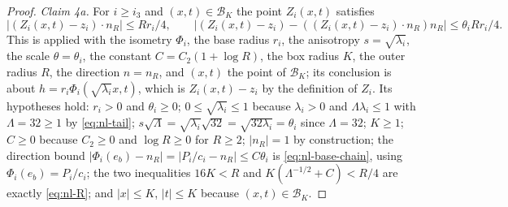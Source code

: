 \begin{proof}
\emph{Claim 4a.} For $i\ge i_3$ and $(x,t)\in\mathcal B_K$ the point
$Z_i(x,t)$ satisfies
\[
  |(Z_i(x,t)-z_i)\cdot n_R|\le Rr_i/4,\qquad
  \bigl|(Z_i(x,t)-z_i)-((Z_i(x,t)-z_i)\cdot n_R)n_R\bigr|\le\theta_iRr_i/4 .
\]
This is  applied with the isometry $\Phi_i$, the
base radius $r_i$, the anisotropy $s=\sqrt{\lambda_i}$, the scale
$\theta=\theta_i$, the constant $C=C_2(1+\log R)$, the box radius $K$, the outer
radius $R$, the direction $n=n_R$, and $(x,t)$ the point of $\mathcal B_K$; its
conclusion is about $h=r_i\Phi_i(\sqrt{\lambda_i}x,t)$, which is $Z_i(x,t)-z_i$ by
the definition of $Z_i$. Its hypotheses hold: $r_i>0$ and $\theta_i\ge0$;
$0\le\sqrt{\lambda_i}\le1$ because $\lambda_i>0$ and $\Lambda\lambda_i\le1$ with
$\Lambda=32\ge1$ by \eqref{eq:nl-tail};
$s\sqrt\Lambda=\sqrt{\lambda_i}\sqrt{32}=\sqrt{32\lambda_i}=\theta_i$ since
$\Lambda=32$; $K\ge1$; $C\ge0$ because $C_2\ge0$ and $\log R\ge0$ for $R\ge2$;
$|n_R|=1$ by construction; the direction bound
$|\Phi_i(e_b)-n_R|=|P_i/c_i-n_R|\le C\theta_i$ is \eqref{eq:nl-base-chain},
using $\Phi_i(e_b)=P_i/c_i$; the two inequalities $16K<R$ and
$K(\Lambda^{-1/2}+C)<R/4$ are exactly \eqref{eq:nl-R}; and $|x|\le K$, $|t|\le K$
because $(x,t)\in\mathcal B_K$.


\end{proof}
